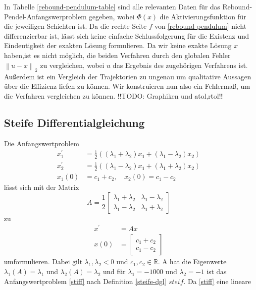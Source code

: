 In Tabelle \ref{rebound-pendulum-table} sind alle relevanten Daten für das Rebound-Pendel-Anfangswerproblem gegeben,
wobei $\Phi(x)$ die Aktivierungsfunktion für die jeweiligen Schichten ist. Da die rechte Seite $f$ von
\eqref{rebound-pendulum} nicht differenzierbar ist, lässt sich keine einfache Schlussfolgerung für die Existenz und
Eindeutigkeit der exakten Lösung formulieren. Da wir keine exakte Lösung $x$haben,ist es nicht möglich, die beiden
Verfahren durch den globalen Fehler $\left\lVert u - x \right\rVert_2$ zu vergleichen, wobei $u$ das Ergebnis des
zugehörigen Verfahrens ist. Außerdem ist ein Vergleich der Trajektorien zu ungenau um qualitative Aussagen über die
Effizienz liefen zu können. Wir konstruieren nun also ein Fehlermaß, um die Verfahren vergleichen zu können.
!!TODO: Graphiken und atol,rtol!!

\subsection{Steife Differentialgleichung}
\label{sec:steife-differentialgleichung}
Die Anfangswertproblem
\begin{align}
       \label{stiff}
       x_{1}^{\prime} &= \frac{1}{2} ((\lambda_1 + \lambda_2)x_1 + (\lambda_1 - \lambda_2)x_2) \nonumber \\
       x_{2}^{\prime} &= \frac{1}{2} ((\lambda_1 - \lambda_2)x_1 + (\lambda_1 + \lambda_2)x_2) \\
       x_1(0) &= c_1 + c_2, \quad x_2(0) = c_1 - c_2 \nonumber
\end{align}
lässt sich mit der Matrix
\[
       A = \frac{1}{2}
       \begin{bmatrix}
                \lambda_1 + \lambda_2 & \lambda_1 - \lambda_2 \\
                \lambda_1 - \lambda_2 & \lambda_1 + \lambda_2
       \end{bmatrix}
\]
zu
\begin{align*}
       x^{\prime} &= Ax \\
       x(0) &=
       \begin{bmatrix}
              c_1 + c_2 \\
              c_1 - c_2
       \end{bmatrix}
\end{align*}
umformulieren. Dabei gilt $\lambda_1, \lambda_2 < 0$ und $c_1, c_2 \in \mathbb{R}$. A hat die Eigenwerte
$\lambda_1(A) = \lambda_1$ und $\lambda_2(A) = \lambda_2$ und für $\lambda_1 = -1000$ und $\lambda_2 = -1$ ist
das Anfangswertproblem \eqref{stiff} nach Definition \eqref{steife-dgl} $steif$. Da \eqref{stiff} eine lineare
